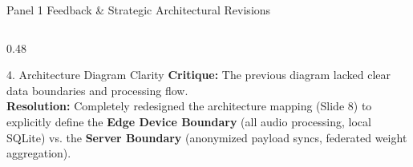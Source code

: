 \documentclass[aspectratio=169, 11pt, xcolor=table]{beamer}
\begin{document}
\begin{frame}{Panel 1 Feedback \& Strategic Architectural Revisions}
\begin{columns}[T, totalwidth=\textwidth]
\begin{column}{0.48\textwidth}
            \vspace{0.5mm}
            \begin{block}{4. Architecture Diagram Clarity}
                \tiny
                \textbf{Critique:} The previous diagram lacked clear data boundaries and processing flow.\\
                \textbf{Resolution:} Completely redesigned the architecture mapping (Slide 8) to explicitly define the \textbf{Edge Device Boundary} (all audio processing, local SQLite) vs. the \textbf{Server Boundary} (anonymized payload syncs, federated weight aggregation).
            \end{block}
        \end{column}

    \end{columns}
\end{frame}

\end{document}
